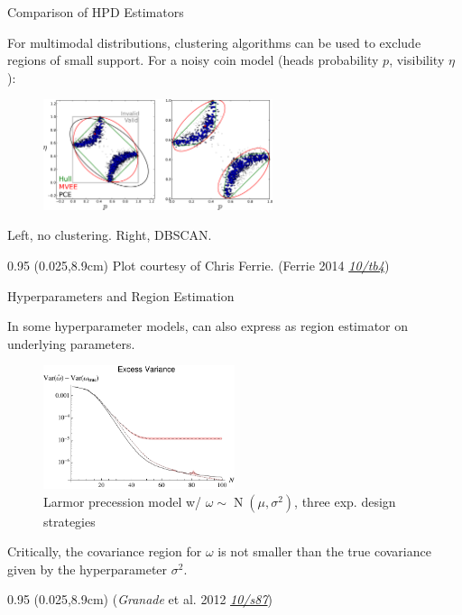 \documentclass[xcolor=dvipsnames, compress]{beamer}
\renewcommand\UrlFont{\color{red}\rmfamily\itshape}
\newcommand{\shortdoi}[1]{\href{http://doi.org/#1}{\UrlFont 10/#1}}
\newcommand{\N}{\operatorname{N}}
\newcommand{\bottomnote}[1]{
  \begin{textblock*}{0.95\paperwidth} (0.025\paperwidth,8.9cm)
    {\tiny \hfill #1}
  \end{textblock*}
}
\begin{document}
\begin{frame}{Comparison of HPD Estimators}

  For multimodal distributions, clustering algorithms can be used
  to exclude regions of small support.
  For a noisy coin model (heads probability $p$, visibility $\eta$):

  \begin{figure}
    \includegraphics[width=0.6\textwidth]{hpd-clusters}
  \end{figure}

  Left, no clustering. Right, DBSCAN.

  \bottomnote{Plot courtesy of Chris Ferrie. (Ferrie 2014 \shortdoi{tb4})}

\end{frame}

\begin{frame}{Hyperparameters and Region Estimation}

  In some hyperparameter models, can also express as region
  estimator on underlying parameters.

  \begin{figure}
    \centering
    \includegraphics[width=0.5\textwidth]{hypernormal-excess-cov}
    \caption{Larmor precession model w/ $\omega\sim\N(\mu, \sigma^2)$, three exp. design strategies}
  \end{figure}

  Critically, the covariance region for $\omega$ is not smaller
  than the true covariance given by the hyperparameter $\sigma^2$.

  \bottomnote{(\emph{Granade} et al. 2012 \shortdoi{s87})}

\end{frame}
\end{document}
